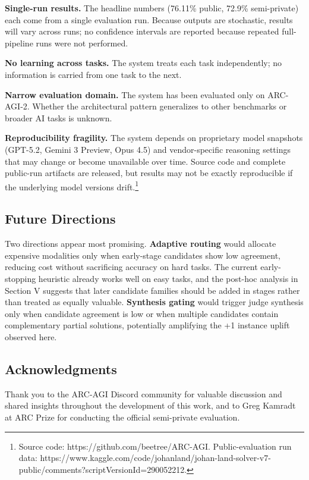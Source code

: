 \documentclass[conference]{IEEEtran}
\begin{document}
\textbf{Single-run results.} The headline numbers (76.11\% public,
72.9\% semi-private) each come from a single evaluation run. Because
outputs are stochastic, results will vary across runs; no confidence
intervals are reported because repeated full-pipeline runs were not
performed.

\textbf{No learning across tasks.} The system treats each task
independently; no information is carried from one task to the next.

\textbf{Narrow evaluation domain.} The system has been evaluated only on
ARC-AGI-2. Whether the architectural pattern generalizes to other
benchmarks or broader AI tasks is unknown.

\textbf{Reproducibility fragility.} The system depends on proprietary
model snapshots (GPT-5.2, Gemini 3 Preview, Opus 4.5) and
vendor-specific reasoning settings that may change or become unavailable
over time. Source code and complete public-run artifacts are released,
but results may not be exactly reproducible if the underlying model
versions drift.\footnote{Source code:
  https://github.com/beetree/ARC-AGI. Public-evaluation run data:
  https://www.kaggle.com/code/johanland/johan-land-solver-v7-public/comments?scriptVersionId=290052212.}

\subsection{Future Directions}\label{future-directions}

Two directions appear most promising. \textbf{Adaptive routing} would
allocate expensive modalities only when early-stage candidates show low
agreement, reducing cost without sacrificing accuracy on hard tasks. The
current early-stopping heuristic already works well on easy tasks, and
the post-hoc analysis in Section V suggests that later candidate
families should be added in stages rather than treated as equally
valuable. \textbf{Synthesis gating} would trigger judge synthesis only
when candidate agreement is low or when multiple candidates contain
complementary partial solutions, potentially amplifying the +1 instance
uplift observed here.

\subsection{Acknowledgments}\label{acknowledgments}

Thank you to the ARC-AGI Discord community for valuable discussion and
shared insights throughout the development of this work, and to Greg
Kamradt at ARC Prize for conducting the official semi-private
evaluation.
\end{document}
